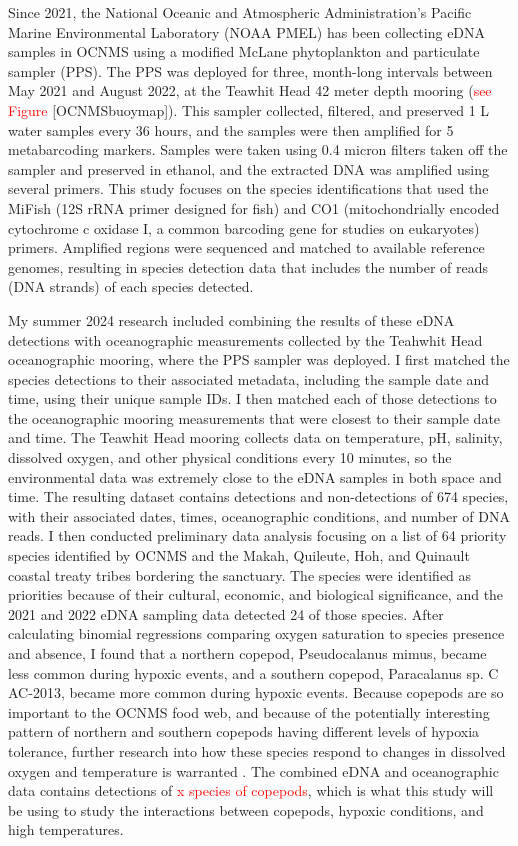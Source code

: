 \documentclass[12pt,twoside]{reedthesis}
\begin{document}
Since 2021, the National Oceanic and Atmospheric Administration's Pacific Marine Environmental Laboratory (NOAA PMEL) has been collecting eDNA samples in OCNMS using a modified McLane phytoplankton and particulate sampler (PPS).  The PPS was deployed for three, month-long intervals between May 2021 and August 2022, at the Teawhit Head 42 meter depth mooring (\textcolor{red}{see Figure} [OCNMSbuoymap]). This sampler collected, filtered, and preserved 1 L water samples every 36 hours, and the samples were then amplified for 5 metabarcoding markers. Samples were taken using 0.4 micron filters taken off the sampler and preserved in ethanol, and the extracted DNA was amplified using several primers. This study focuses on the species identifications that used the MiFish (12S rRNA primer designed for fish) and CO1 (mitochondrially encoded cytochrome c oxidase I, a common barcoding gene for studies on eukaryotes) primers. Amplified regions were sequenced and matched to available reference genomes, resulting in species detection data that includes the number of reads (DNA strands) of each species detected. 

My summer 2024 research included combining the results of these eDNA detections with oceanographic measurements collected by the Teahwhit Head oceanographic mooring, where the PPS sampler was deployed. I first matched the species detections to their associated metadata, including the sample date and time, using their unique sample IDs. I then matched each of those detections to the oceanographic mooring measurements that were closest to their sample date and time. The Teawhit Head mooring collects data on temperature, pH, salinity, dissolved oxygen, and other physical conditions every 10 minutes, so the environmental data was extremely close to the eDNA samples in both space and time. The resulting dataset contains detections and non-detections of 674 species, with their associated dates, times, oceanographic conditions, and number of DNA reads. I then conducted preliminary data analysis focusing on a list of 64 priority species identified by OCNMS and the Makah, Quileute, Hoh, and Quinault coastal treaty tribes bordering the sanctuary. The species were identified as priorities because of their cultural, economic, and biological significance, and the 2021 and 2022 eDNA sampling data detected 24 of those species. After calculating binomial regressions comparing oxygen saturation to species presence and absence, I found that a northern copepod, Pseudocalanus mimus, became less common during hypoxic events, and a southern copepod, Paracalanus sp. C AC-2013, became more common during hypoxic events. Because copepods are so important to the OCNMS food web, and because of the potentially interesting pattern of northern and southern copepods having different levels of hypoxia tolerance, further research into how these species respond to changes in dissolved oxygen and temperature is warranted \autocite{Fisheries2024}. The combined eDNA and oceanographic data contains detections of \textcolor{red}{x species of copepods}, which is what this study will be using to study the interactions between copepods, hypoxic conditions, and high temperatures.
\end{document}
